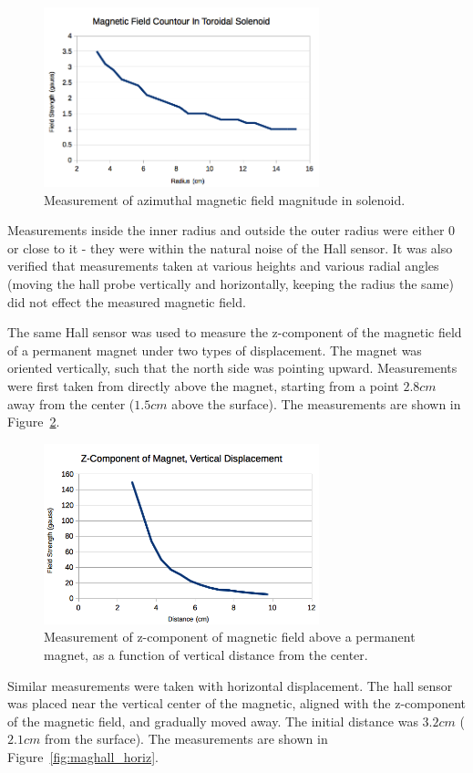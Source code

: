 \documentclass[journal]{IEEEtran}
\begin{document}
\begin{figure}[ht!]
\centering
\includegraphics[width=80mm]{toroid_hall.png}
\caption{Measurement of azimuthal magnetic field
magnitude in solenoid.}
\label{fig:toroid_hall}
\end{figure}


Measurements inside the inner radius and outside the outer radius were either 0
or close to it - they were within the natural noise of the Hall sensor. It was
also verified that measurements taken at various heights and various radial
angles (moving the hall probe vertically and horizontally, keeping the radius
the same) did not effect the measured magnetic field.

The same Hall sensor was used to measure the z-component of the magnetic field
of a permanent magnet under two types of displacement. The magnet was oriented
vertically, such that the north side was pointing upward. Measurements were
first taken from directly above the magnet, starting from a point $2.8 cm$ away
from the center ($1.5 cm$ above the surface). The measurements are shown in
Figure~\ref{fig:maghall_vert}.

\begin{figure}[ht!]
\centering
\includegraphics[width=80mm]{maghall_vert.png}
\caption{Measurement of z-component of magnetic field above a permanent magnet,
as a function of vertical distance from the center.}
\label{fig:maghall_vert}
\end{figure}

Similar measurements were taken with horizontal displacement. The hall sensor
was placed near the vertical center of the magnetic, aligned with the
z-component of the magnetic field, and gradually moved away. The initial
distance was $3.2 cm$ ($2.1 cm$ from the surface). The measurements are shown
in Figure~\ref{fig:maghall_horiz}.
\end{document}
